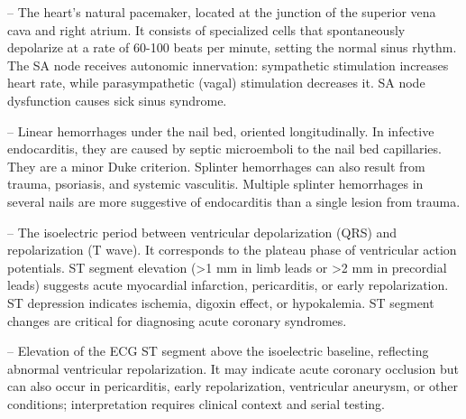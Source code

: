 -- The heart's natural pacemaker, located at the junction of the superior vena cava and right atrium. It consists of specialized cells that spontaneously depolarize at a rate of 60-100 beats per minute, setting the normal sinus rhythm. The SA node receives autonomic innervation: sympathetic stimulation increases heart rate, while parasympathetic (vagal) stimulation decreases it. SA node dysfunction causes sick sinus syndrome.

-- Linear hemorrhages under the nail bed, oriented longitudinally. In infective endocarditis, they are caused by septic microemboli to the nail bed capillaries. They are a minor Duke criterion. Splinter hemorrhages can also result from trauma, psoriasis, and systemic vasculitis. Multiple splinter hemorrhages in several nails are more suggestive of endocarditis than a single lesion from trauma.

-- The isoelectric period between ventricular depolarization (QRS) and repolarization (T wave). It corresponds to the plateau phase of ventricular action potentials. ST segment elevation (>1 mm in limb leads or >2 mm in precordial leads) suggests acute myocardial infarction, pericarditis, or early repolarization. ST depression indicates ischemia, digoxin effect, or hypokalemia. ST segment changes are critical for diagnosing acute coronary syndromes.

-- Elevation of the ECG ST segment above the isoelectric baseline, reflecting abnormal ventricular repolarization. It may indicate acute coronary occlusion but can also occur in pericarditis, early repolarization, ventricular aneurysm, or other conditions; interpretation requires clinical context and serial testing.

